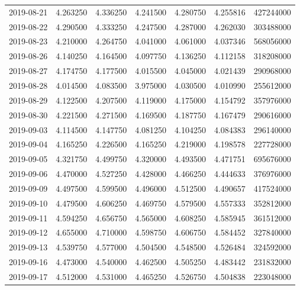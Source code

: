 \begin{tabular}{lrrrrrr}
2019-08-21 &    4.263250 &    4.336250 &    4.241500 &    4.280750 &    4.255816 &   427244000 \\
2019-08-22 &    4.290500 &    4.333250 &    4.247500 &    4.287000 &    4.262030 &   303488000 \\
2019-08-23 &    4.210000 &    4.264750 &    4.041000 &    4.061000 &    4.037346 &   568056000 \\
2019-08-26 &    4.140250 &    4.164500 &    4.097750 &    4.136250 &    4.112158 &   318208000 \\
2019-08-27 &    4.174750 &    4.177500 &    4.015500 &    4.045000 &    4.021439 &   290968000 \\
2019-08-28 &    4.014500 &    4.083500 &    3.975000 &    4.030500 &    4.010990 &   255612000 \\
2019-08-29 &    4.122500 &    4.207500 &    4.119000 &    4.175000 &    4.154792 &   357976000 \\
2019-08-30 &    4.221500 &    4.271500 &    4.169500 &    4.187750 &    4.167479 &   290616000 \\
2019-09-03 &    4.114500 &    4.147750 &    4.081250 &    4.104250 &    4.084383 &   296140000 \\
2019-09-04 &    4.165250 &    4.226500 &    4.165250 &    4.219000 &    4.198578 &   227728000 \\
2019-09-05 &    4.321750 &    4.499750 &    4.320000 &    4.493500 &    4.471751 &   695676000 \\
2019-09-06 &    4.470000 &    4.527250 &    4.428000 &    4.466250 &    4.444633 &   376976000 \\
2019-09-09 &    4.497500 &    4.599500 &    4.496000 &    4.512500 &    4.490657 &   417524000 \\
2019-09-10 &    4.479500 &    4.606250 &    4.469750 &    4.579500 &    4.557333 &   352812000 \\
2019-09-11 &    4.594250 &    4.656750 &    4.565000 &    4.608250 &    4.585945 &   361512000 \\
2019-09-12 &    4.655000 &    4.710000 &    4.598750 &    4.606750 &    4.584452 &   327840000 \\
2019-09-13 &    4.539750 &    4.577000 &    4.504500 &    4.548500 &    4.526484 &   324592000 \\
2019-09-16 &    4.473000 &    4.540000 &    4.462500 &    4.505250 &    4.483442 &   231832000 \\
2019-09-17 &    4.512000 &    4.531000 &    4.465250 &    4.526750 &    4.504838 &   223048000 \\

\end{tabular}
